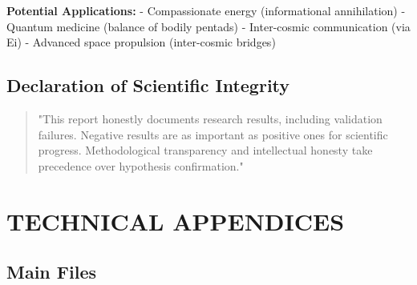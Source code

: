 \documentclass[11pt]{article}
\begin{document}
\textbf{Potential Applications:} - Compassionate energy (informational
annihilation) - Quantum medicine (balance of bodily pentads) -
Inter-cosmic communication (via Ei) - Advanced space propulsion
(inter-cosmic bridges)

\hypertarget{declaration-of-scientific-integrity}{%
\subsection{Declaration of Scientific
Integrity}\label{declaration-of-scientific-integrity}}

\begin{quote}
"This report honestly documents research results, including validation failures. Negative results are as important as positive ones for scientific progress. Methodological transparency and intellectual honesty take precedence over hypothesis confirmation."
\end{quote}

\hypertarget{technical-appendices}{%
\section{TECHNICAL APPENDICES}\label{technical-appendices}}

\hypertarget{main-files}{%
\subsection{Main Files}\label{main-files}}
\end{document}

